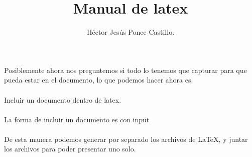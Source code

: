\documentclass[10pt,letterpaper]{article}
\author{Héctor Jesús Ponce Castillo.}
\title{Manual de latex}
\begin{document}
Posiblemente ahora nos preguntemos si todo lo tenemos que capturar para que pueda estar en el documento, lo que podemos hacer ahora es.\\ \\

Incluir un documento dentro de latex.\\ \\

La forma de incluir un documento es con input\\ \\
 
De esta manera podemos generar por separado los archivos de \LaTeX{}, y juntar los archivos para poder presentar uno solo.
\end{document}
